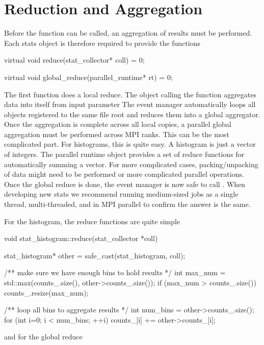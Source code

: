 \section{Reduction and Aggregation}\label{sec:reduceStats}
Before the  function can be called, an aggregation of results must be performed.
Each stats object is therefore required to provide the functions

\begin{CppCode} 
virtual void
reduce(stat_collector* coll) = 0;

virtual void
global_reduce(parallel_runtime* rt) = 0;
\end{CppCode}
The first function does a local reduce.
The object calling the  function aggregates data into itself from input parameter 
The event manager automatically loops all objects registered to the same file root and reduces them into a global aggregator.
Once the aggregation is complete across all local copies,
a parallel global aggregation must be performed across MPI ranks.
This can be the most complicated part.
For histograms, this is quite easy.
A histogram is just a vector of integers.
The \sstmacro parallel runtime object provides a set of reduce functions for automatically summing a vector.
For more complicated cases, packing/unpacking of data might need to be performed or more complicated parallel operations.
Once the global reduce is done, the event manager is now safe to call .
When developing new stats we recommend running medium-sized jobs as a single thread, multi-threaded, and in MPI parallel to confirm the answer is the same.

For the histogram, the reduce functions are quite simple

\begin{CppCode}
void
stat_histogram::reduce(stat_collector *coll)
{
  stat_histogram* other = safe_cast(stat_histogram, coll);

  /** make sure we have enough bins to hold results */
  int max_num = std::max(counts_.size(), other->counts_.size());
  if (max_num > counts_.size()){
    counts_.resize(max_num);
  }

  /** loop all bins to aggregate results */
  int num_bins = other->counts_.size();
  for (int i=0; i < num_bins; ++i){
    counts_[i] += other->counts_[i];
  }
}
\end{CppCode}

and for the global reduce


